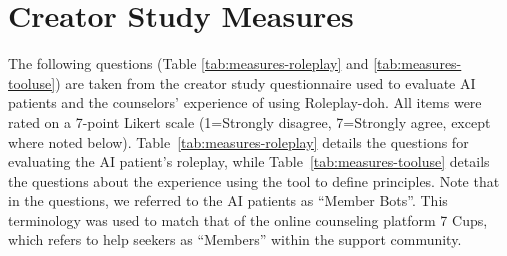 \documentclass[11pt]{article}
\begin{document}
\section{Creator Study Measures}
\label{appendix:creatorstudy-measure}

The following questions (Table \ref{tab:measures-roleplay} and \ref{tab:measures-tooluse}) are taken from the creator study questionnaire used to evaluate AI patients and the counselors' experience of using Roleplay-doh.
All items were rated on a 7-point Likert scale (1=Strongly disagree, 7=Strongly agree, except where noted below).
Table~\ref{tab:measures-roleplay} details the questions for evaluating the AI patient's roleplay, while Table~\ref{tab:measures-tooluse} details the questions about the experience using the tool to define principles.
Note that in the questions, we referred to the AI patients as ``Member Bots''. This terminology was used to match that of the online counseling platform 7 Cups, which refers to help seekers as ``Members'' within the support community.

\begin{table}[t]
    \centering
    \caption{Six measures used by creators to evaluate the two AI patients they created. Several measures were rephrased from prior work on evaluating Standardized Patients, or trained human actors, on case roleplay ability~\cite{himmelbauer2018standardized}.}
    \label{tab:measures-roleplay}
\end{table}
 
\end{document}
